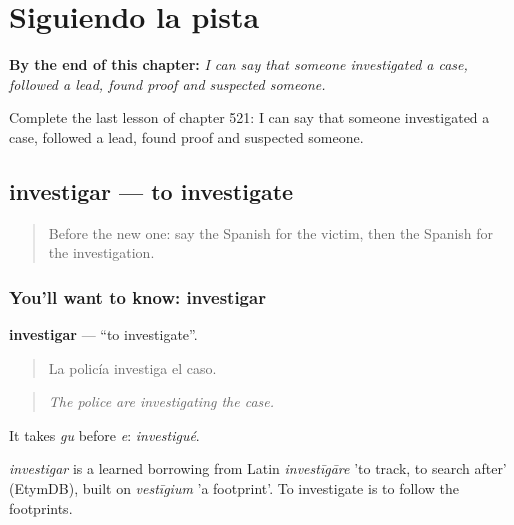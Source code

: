 
\chapter{Siguiendo la pista}
\label{ch:es-siguiendo-la-pista}

\begin{chapteropening}
\textbf{By the end of this chapter:} \emph{I can say that someone investigated a case, followed a lead, found proof and suspected someone.}

Complete the last lesson of chapter 521: I can say that someone investigated a case, followed a lead, found proof and suspected someone.
\end{chapteropening}

\section[investigar]{investigar — to investigate}

\label{lesson:ES-C521-investigar}



\begin{quote}
Before the new one: say the Spanish for the victim, then the Spanish for the investigation.
\end{quote}

\subsection*{You'll want to know: investigar}
\textbf{investigar} — \textquotedblleft{}to investigate\textquotedblright{}.

\begin{quote}
La policía investiga el caso.
\end{quote}

\begin{quote}
\emph{The police are investigating the case.}
\end{quote}

It takes \emph{gu} before \emph{e}: \emph{investigué}.

\begin{cousinweb}
\emph{investigar} is a learned borrowing from Latin \emph{investīgāre} 'to track, to search after' (EtymDB), built on \emph{vestīgium} 'a footprint'. To investigate is to follow the footprints.
\end{cousinweb}


